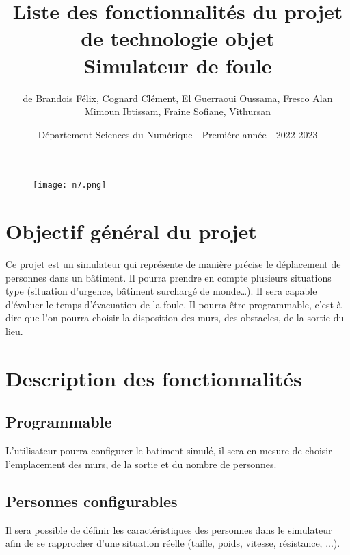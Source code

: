 \documentclass{article}
\begin{document}
\begin{figure}[t]
\centering
\texttt{[image: n7.png]}
\end{figure}

\title{\vspace{4cm} \textbf{Liste des fonctionnalités du projet de technologie objet\\Simulateur de foule}}
\author{de Brandois Félix, Cognard Clément, El Guerraoui Oussama, Fresco Alan\\ Mimoun Ibtissam, Fraine Sofiane, Vithursan}
\date{\vspace{7cm} Département Sciences du Numérique - Premiére année - 2022-2023 }

\maketitle

\newpage
\tableofcontents
\listoffigures

\newpage
\section{Objectif général du projet}
Ce projet est un simulateur qui représente de manière précise le déplacement de personnes dans un bâtiment. Il pourra prendre en compte plusieurs situations type (situation d’urgence, bâtiment surchargé de monde…). Il sera capable d’évaluer le temps d’évacuation de la foule. Il pourra être programmable, c’est-à-dire que l’on pourra choisir la disposition des murs, des obstacles, de la sortie du lieu.

\section{Description des fonctionnalités}
    \subsection{Programmable}
    L'utilisateur pourra configurer le batiment simulé, il sera en mesure de choisir l'emplacement des murs, de la sortie et du nombre de personnes.
    
    \subsection{Personnes configurables}
    Il sera possible de définir les caractéristiques des personnes dans le simulateur afin de se rapprocher d'une situation réelle (taille, poids, vitesse, résistance, ...).
\end{document}
